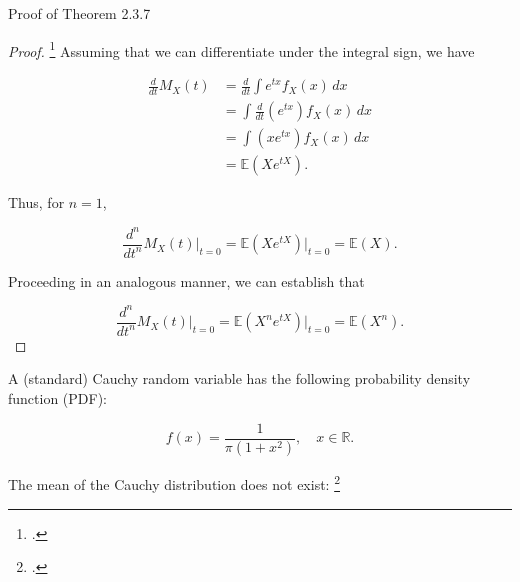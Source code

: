 \documentclass[UTF8,a4paper,10pt]{article}
\begin{document}
\begin{mybox}{Proof of Theorem 2.3.7}

  \begin{proof}\footcite[][62-63]{Casella2002}
  Assuming that we can differentiate under the integral sign, we have
  
  \[
  \begin{aligned}
  \frac{d}{dt} M_X(t) &= \frac{d}{dt} \int e^{tx} f_X(x) \, dx \\
  &= \int \frac{d}{dt} (e^{tx}) f_X(x) \, dx \\
  &= \int (x e^{tx}) f_X(x) \, dx \\
  &= \mathbb{E}(Xe^{tX}).
  \end{aligned}
  \]
  
  Thus, for \(n = 1\),
  
  \[
  \frac{d^n}{dt^n} M_X(t)\Big|_{t=0} = \mathbb{E}(Xe^{tX})\Big|_{t=0} = \mathbb{E}(X).
  \]
  
  Proceeding in an analogous manner, we can establish that
  
  \[
  \frac{d^n}{dt^n} M_X(t)\Big|_{t=0} = \mathbb{E}(X^n e^{tX})\Big|_{t=0}= \mathbb{E}(X^n).
  \]
  \end{proof}
  
\end{mybox}

\dotfill




  


A (standard) Cauchy random variable has the following probability density function (PDF):

\[
f(x) = \frac{1}{\pi \left(1 + x^2\right)}, \quad x \in \mathbb{R}.
\]

The mean of the Cauchy distribution does not exist: 
\footcite[][56]{Casella2002}

\end{document}
